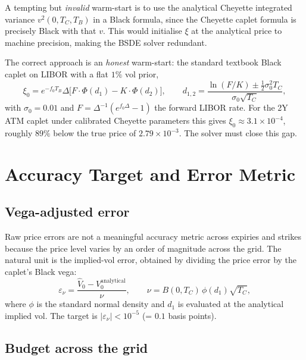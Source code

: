 \documentclass[11pt,a4paper]{article}
\begin{document}
A tempting but \emph{invalid} warm-start is to use the analytical Cheyette
integrated variance $v^2(0, T_C, T_B)$ in a Black formula, since the
Cheyette caplet formula is precisely Black with that $v$. This would
initialise $\xi$ at the analytical price to machine precision, making the
BSDE solver redundant.

The correct approach is an \emph{honest} warm-start: the standard textbook
Black caplet on LIBOR with a flat $1\%$ vol prior,
\begin{equation}
  \xi_0 = e^{-f_0 T_B} \Delta
    \bigl[F \cdot \Phi(d_1) - K \cdot \Phi(d_2)\bigr], \qquad
  d_{1,2} = \frac{\ln(F/K) \pm \tfrac{1}{2}\sigma_0^2 T_C}{\sigma_0\sqrt{T_C}},
  \label{eq:warmstart}
\end{equation}
with $\sigma_0 = 0.01$ and $F = \Delta^{-1}(e^{f_0\Delta} - 1)$ the forward
LIBOR rate. For the 2Y ATM caplet under calibrated Cheyette parameters this
gives $\xi_0 \approx 3.1 \times 10^{-4}$, roughly $89\%$ below the true
price of $2.79 \times 10^{-3}$. The solver must close this gap.

\section{Accuracy Target and Error Metric}
\label{sec:accuracy}

\subsection{Vega-adjusted error}

Raw price errors are not a meaningful accuracy metric across expiries and
strikes because the price level varies by an order of magnitude across the
grid. The natural unit is the implied-vol error, obtained by dividing the
price error by the caplet's Black vega:
\begin{equation}
  \varepsilon_{\nu} = \frac{\widehat{V}_0 - V_0^{\mathrm{analytical}}}{\nu},
  \qquad
  \nu = B(0, T_C)\,\phi(d_1)\sqrt{T_C},
  \label{eq:vegaerr}
\end{equation}
where $\phi$ is the standard normal density and $d_1$ is evaluated at the
analytical implied vol. The target is $|\varepsilon_\nu| < 10^{-5}$
(= $0.1$ basis points).

\subsection{Budget across the grid}
\end{document}
